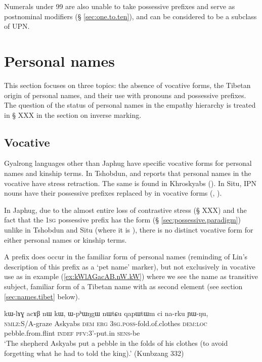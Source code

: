 Numerals under 99 are also unable to take possessive prefixes and serve as postnominal modifiers (§ \ref{sec:one.to.ten}), and can be considered to be a subclass of UPN.

\section{Personal names}  \label{sec:personal.names}
This section focuses on three topics: the absence of vocative forms, the Tibetan origin of personal names, and their use with pronouns and possessive prefixes. The question of the status of personal names in the empathy hierarchy is treated in § XXX in the section on inverse marking.

\subsection{Vocative} \label{sec:vocative}
Gyalrong languages other than Japhug have specific vocative forms for personal names and kinship terms. In Tshobdun, \citet[133]{jackson98morphology} and \citet[53]{jackson05yingao} reports that personal names in the vocative have stress retraction. The same is found in Khroskyabs (\citealt[153]{lai17khroskyabs}). In Situ, IPN nouns have their possessive prefixes replaced by  in vocative forms (\citealt[471]{nagano03cogtse}, \citealt[177]{prins16kyomkyo}). 

In Japhug, due to the almost entire loss of contrastive stress (§ XXX) and the fact that the \textsc{1sg} possessive prefix has the form  (§ \ref{sec:possessive.paradigm}) unlike in Tshobdun and Situ (where it is ), there is no distinct vocative form for either personal names or kinship terms. 

A prefix  does occur in the familiar form of personal names (reminding of Lin's \citeyear[162]{linxr93jiarongen} description of this prefix as a  `pet name' marker), but not exclusively in vocative use as in example (\ref{ex:kWlAGacAB.nW.kW}) where we see the name  as transitive subject, familiar form of a Tibetan name with  as second element (see section \ref{sec:names.tibet} below).

 \begin{exe}
\ex \label{ex:kWlAGacAB.nW.kW}
\gll kɯ-lɤɣ acɤβ nɯ kɯ, ɯ-pʰɯŋgɯ nɯtɕu qapɯtɯm ci na-rku ɲɯ-ŋu, \\
\textsc{nmlz}:S/A-graze Askyabs \textsc{dem} \textsc{erg} \textsc{3sg}.\textsc{poss}-fold.of.clothes \textsc{dem:loc} pebble.from.flint \textsc{indef} \textsc{pfv}:3'-put.in \textsc{sens}-be \\
\glt `The shepherd Askyabs put a pebble in the folds of his clothes (to avoid forgetting what he had to told the king).'  (Kunbzang 332)
\end{exe}

